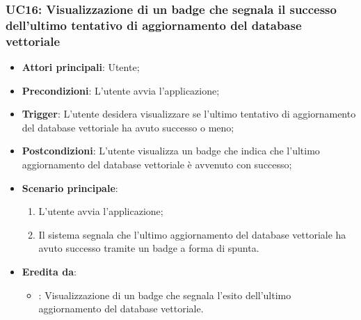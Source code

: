 \hypertarget{UC16}{}
\subsubsection{UC16: Visualizzazione di un badge che segnala il successo dell'ultimo tentativo di aggiornamento del database vettoriale}
\begin{itemize}
    \item \textbf{Attori principali}: Utente;
    \item \textbf{Precondizioni}: L'utente avvia l'applicazione;
    \item \textbf{Trigger}: L'utente desidera visualizzare se l'ultimo tentativo di aggiornamento del database vettoriale
    ha avuto successo o meno;
    \item \textbf{Postcondizioni}: L'utente visualizza un badge che indica che l'ultimo aggiornamento del database vettoriale
    è avvenuto con successo;
    \item \textbf{Scenario principale}:
    \begin{enumerate}
        \item L'utente avvia l'applicazione;
        \item Il sistema segnala che l'ultimo aggiornamento del database vettoriale ha avuto successo tramite un badge a forma di spunta.
    \end{enumerate}
    \item \textbf{Eredita da}:
    \begin{itemize}
        \item {}: Visualizzazione di un badge che segnala l'esito dell'ultimo aggiornamento del database vettoriale.
    \end{itemize}
\end{itemize}

\hypertarget{UC17}{}
